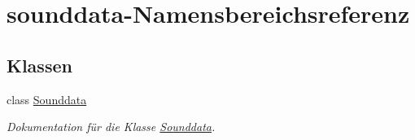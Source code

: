 \hypertarget{namespacesounddata}{}\section{sounddata-\/\+Namensbereichsreferenz}
\label{namespacesounddata}
\subsection*{Klassen}
\begin{DoxyCompactItemize}
\item 
class \mbox{\hyperlink{classsounddata_1_1_sounddata}{Sounddata}}
\begin{DoxyCompactList}\small\item\em Dokumentation für die Klasse \mbox{\hyperlink{classsounddata_1_1_sounddata}{Sounddata}}. \end{DoxyCompactList}\end{DoxyCompactItemize}
